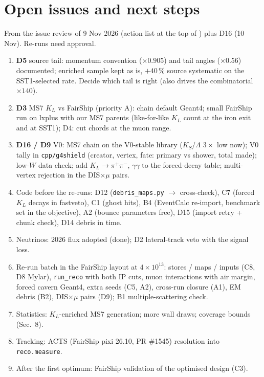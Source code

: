 \section{Open issues and next steps}

From the issue review of 9 Nov 2026 (action list at the top of ) plus D16 (10 Nov). Re-runs need
approval.

\begin{enumerate}
\item \textbf{D5} source tail: momentum convention ($\times0.905$) and tail angles ($\times0.56$) documented; enriched
sample kept as is, $+40\,\%$ source systematic on the SST1-selected rate. Decide which tail is right (also drives the
combinatorial $\times140$).
\item \textbf{D3} MS7 $K_L$ vs FairShip (priority A): chain default Geant4; small FairShip run on lxplus with our MS7
parents (like-for-like $K_L$ count at the iron exit and at SST1); D4: cut chords at the muon range.
\item \textbf{D16 / D9} V0: MS7 chain on the V0-stable library ($K_S$/$\Lambda$ $3\times$ low now); V0 tally in
\texttt{cpp/g4shield} (creator, vertex, fate: primary vs shower, total made); low-$W$ data check; add
$K_L\to\pi^+\pi^-$, $\gamma\gamma$ to the forced-decay table; multi-vertex rejection in the DIS$\times\mu$ pairs.
\item Code before the re-runs: D12 (\texttt{debris\_maps.py} $\to$ cross-check), C7 (forced $K_L$ decays in fastveto),
C1 (ghost hits), B4 (EventCalc re-import, benchmark set in the objective), A2 (bounce parameters free), D15 (import
retry + chunk check), D14 debris in time.
\item Neutrinos: 2026 flux adopted (done); D2 lateral-track veto with the signal loss.
\item Re-run batch in the FairShip layout at $4\times10^{13}$: stores / maps / inputs (C8, D8 Mylar), \texttt{run\_reco}
with both IP cuts, muon interactions with air margin, forced cavern Geant4, extra seeds (C5, A2), cross-run closure
(A1), EM debris (B2), DIS$\times\mu$ pairs (D9); B1 multiple-scattering check.
\item Statistics: $K_L$-enriched MS7 generation; more wall draws; coverage bounds (Sec.~8).
\item Tracking: ACTS (FairShip pixi 26.10, PR \#1545) resolution into \texttt{reco.measure}.
\item After the first optimum: FairShip validation of the optimised design (C3).
\end{enumerate}


